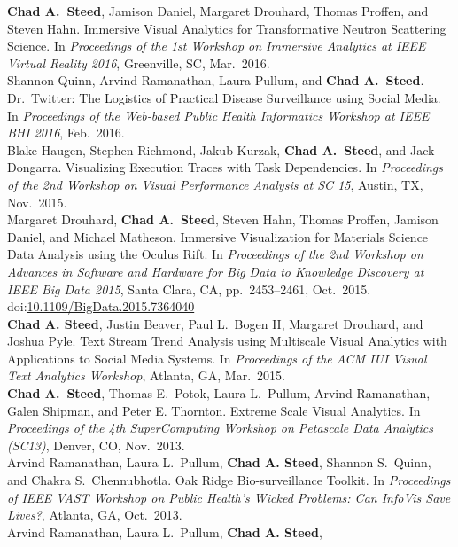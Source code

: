 \documentclass[11pt, a4paper]{article}
\newcommand{\years}[1]{\marginnote{\scriptsize #1}}
\begin{document}
\begin{sloppypar}
\noindent\years{2016}\textbf{Chad A.\ Steed}, Jamison Daniel, Margaret
Drouhard, Thomas Proffen, and Steven Hahn. Immersive Visual Analytics for
Transformative Neutron Scattering Science.
In \emph{Proceedings of the 1st Workshop on Immersive Analytics at IEEE Virtual
Reality 2016}, Greenville, SC, Mar.\ 2016.\\
\years{2016}Shannon Quinn, Arvind Ramanathan, Laura Pullum, and
\textbf{Chad A.\ Steed}. Dr.\ Twitter: The Logistics of Practical Disease
Surveillance using Social Media.
In \emph{Proceedings of the Web-based Public Health Informatics Workshop at
IEEE BHI 2016}, Feb.\ 2016.\\
\years{2015}Blake Haugen, Stephen Richmond, Jakub Kurzak,
\textbf{Chad A.\ Steed}, and Jack Dongarra. Visualizing Execution Traces with
Task Dependencies.
In \emph{Proceedings of the 2nd Workshop on Visual Performance Analysis at SC 15}, Austin, TX, Nov.\ 2015.\\
\years{2015}Margaret Drouhard, \textbf{Chad A.\ Steed}, Steven Hahn,
Thomas Proffen, Jamison Daniel, and Michael Matheson. Immersive Visualization
for Materials Science Data Analysis using the Oculus Rift.
In \emph{Proceedings of the 2nd Workshop on Advances in Software and Hardware for Big Data to Knowledge Discovery at IEEE Big Data 2015}, Santa Clara, CA, pp.\ 2453--2461, Oct.\ 2015. doi:\href{http://dx.doi.org/10.1109/BigData.2015.7364040}{10.1109/BigData.2015.7364040}\\
\years{2015}\textbf{Chad A. Steed}, Justin Beaver, Paul L.\ Bogen II,
Margaret Drouhard, and Joshua Pyle.  Text Stream Trend Analysis using
Multiscale Visual Analytics with Applications to Social Media Systems.
In \emph{Proceedings of the ACM IUI Visual Text Analytics Workshop}, Atlanta,
GA, Mar.\ 2015.\\
\years{2013}\textbf{Chad A.\ Steed}, Thomas E.\ Potok, Laura L.\ Pullum,
Arvind Ramanathan, Galen Shipman, and Peter E. Thornton. Extreme Scale Visual Analytics.
In \emph{Proceedings of the 4th SuperComputing Workshop on Petascale Data Analytics (SC13)},
Denver, CO, Nov.\ 2013.\\
\years{2013}Arvind Ramanathan, Laura L.\ Pullum, \textbf{Chad A. Steed},
Shannon S.\ Quinn, and Chakra S.\ Chennubhotla. Oak Ridge Bio-surveillance Toolkit.
In \emph{Proceedings of IEEE VAST Workshop on Public Health's Wicked Problems:
Can InfoVis Save Lives?}, Atlanta, GA, Oct.\ 2013.\\
\years{2013}Arvind Ramanathan, Laura L.\ Pullum, \textbf{Chad A. Steed},

\end{sloppypar}
\end{document}
